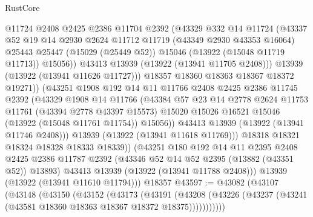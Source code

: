 \begin{lexlean}{RustCore}
\begin{coremodule}
                    @11724
                    @2408
                    @2425
                    @2386
                    @11704
                    @2392
                    (@43329
                      @332
                      @14
                      @11724
                      (@43337
                        @52
                        @19
                        @14
                        @2930
                        @2624
                        @11712
                        @11719
                        (@43349 @2930 @43353 @16064)
                        @25443
                        @25447
                        (@15029 (@25449 @52))
                        @15046
                        (@13922 (@15048 @11719 @11713))
                        @15056))
                    @43413
                    @13939
                    (@13922 (@13941 @11705 @2408)))
                  @13939
                  (@13922 (@13941 @11626 @11727)))
                @18357
                @18360
                @18363
                @18367
                @18372
                @19271))
            (@43251
              @1908
              @192
              @14
              @11
              @11766
              @2408
              @2425
              @2386
              @11745
              @2392
              (@43329
                @1908
                @14
                @11766
                (@43384
                  @57
                  @23
                  @14
                  @2778
                  @2624
                  @11753
                  @11761
                  (@43394 @2778 @43397 @15573)
                  @15020
                  @15026
                  @16521
                  @15046
                  (@13922 (@15048 @11761 @11754))
                  @15056))
              @43413
              @13939
              (@13922 (@13941 @11746 @2408)))
            @13939
            (@13922 (@13941 @11618 @11769)))
          @18318
          @18321
          @18324
          @18328
          @18333
          @18339))
      (@43251
        @180
        @192
        @14
        @11
        @2395
        @2408
        @2425
        @2386
        @11787
        @2392
        (@43346 @52 @14 @52 @2395 (@13882 (@43351 @52)) @13893)
        @43413
        @13939
        (@13922 (@13941 @11788 @2408)))
      @13939
      (@13922 (@13941 @11610 @11794)))
    @18357
@43597 := @43082
    (@43107
      (@43148
        (@43150
          (@43152
            (@43173
              (@43191
                (@43208
                  (@43226 (@43237 (@43241 (@43581 @18360 @18363 @18367 @18372 @18375)))))))))))

\end{coremodule}
\end{lexlean}
